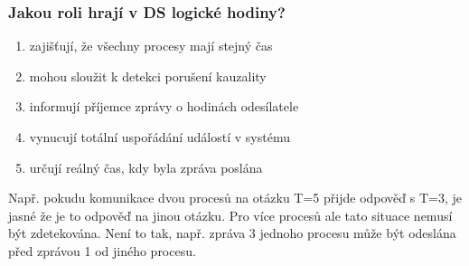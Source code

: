 \documentclass[usenames,dvipsnames,9pt]{beamer}
\begin{document}
{
\begin{frame}[fragile]
\frametitle{Jakou roli hrají v DS logické hodiny?}

\begin{enumerate}
\item zajišťují, že všechny procesy mají stejný čas 
\item mohou sloužit k detekci porušení kauzality 
\item informují příjemce zprávy o hodinách odesílatele 
\item vynucují totální uspořádání událostí v systému  
\item určují reálný čas, kdy byla zpráva poslána  
\end{enumerate}

\begin{overprint}[\textwidth]
   Např. pokudu komunikace dvou procesů na otázku T=5 přijde odpověď s T=3, je jasné že je to odpověď na jinou otázku. Pro více procesů ale tato situace nemusí být zdetekována.
   Není to tak, např. zpráva 3 jednoho procesu může být odeslána před zprávou 1 od jiného procesu.
\end{overprint}

\end{frame}

% 
% 

}
\end{document}
